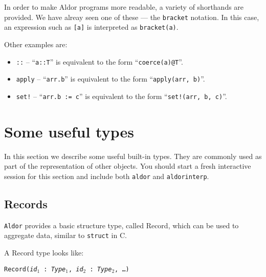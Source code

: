 \documentclass{article}
\newcommand{\Aldor}{{\tt Aldor}}
\begin{document}
In order to make Aldor programs more readable, a variety of shorthands
are provided.  We have alreay seen one of these --- the {\tt bracket}
notation.  In this case, an expression such as {\tt [a]} is
interpreted as {\tt bracket(a)}.


Other examples are: 
\begin{itemize}
\item {\tt ::} --  ``{\tt a::T}''
is equivalent to the form ``\verb!coerce(a)@T!''.
\item {\tt apply} --
``{\tt arr.b}'' is equivalent to the form ``{\tt apply(arr, b)}''.
\item {\tt set!} --
``{\tt arr.b := c}'' is equivalent to the form ``{\tt set!(arr, b, c)}''.
\end{itemize}

%
%

\section{Some useful types}

In this section we describe some useful built-in types.  They are
commonly used as part of the representation of other objects.
You should start a fresh interactive session for this section and
include both {\tt aldor} and {\tt aldorinterp}.

\subsection{Records}

\Aldor{} provides a basic structure type, called Record, which can be
used to aggregate data, similar to {\tt struct} in C.

A Record type looks like:
\begin{center}
{\tt Record({\it id$_1$} : {\it Type$_1$}, {\it id$_2$} : {\it Type$_2$}, \ldots)}
\end{center}
\end{document}
